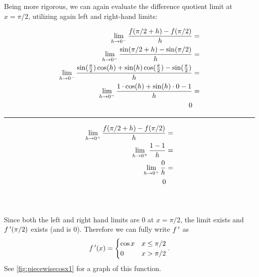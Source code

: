 \begin{example}
Being more rigorous, we can again evaluate the difference quotient limit at $x=\pi/2$, utilizing again left and right-hand limits:\\
{\small{}
\noindent\begin{minipage}{.59\linewidth}
\begin{align*}
\lim_{h\to0^-}\frac{f(\pi/2+h)-f(\pi/2)}{h} =\\
\lim_{h\to0^-}\frac{\sin(\pi/2+h)-\sin(\pi/2)}{h}=\\
\lim_{h\to0^-}{ \frac{\sin(\frac{\pi}{2})\cos(h)+\sin(h)\cos(\frac{\pi}{2})-\sin(\frac{\pi}{2})}{h}}=\\
\lim_{h\to0^-}\frac{1\cdot\cos(h)+\sin(h)\cdot 0-1}{h} =\\
0\hphantom{{}=}
\end{align*}
\end{minipage}%
\begin{minipage}{1pt}
 \rule{.5pt}{100pt}%
\end{minipage}%
\begin{minipage}{.39\linewidth}
\begin{align*}
\lim_{h\to0^+}\frac{f(\pi/2+h)-f(\pi/2)}{h} =\\
\lim_{h\to0^+}\frac{1-1}{h}=\\
\lim_{h\to0^+}\frac{0}{h}=\\
0\hphantom{{}=}\\
\phantom{0}\\
\phantom{0}
\end{align*}
\end{minipage}
}


Since both the left and right hand limits are 0 at $x=\pi/2$, the limit exists and $f\,'(\pi/2)$ exists (and is 0). Therefore we can fully write $f\,'$ as
\[f\,'(x) = \begin{cases}\cos x & x\leq\pi/2\\ 0 & x>\pi/2\end{cases}.\]
See \autoref{fig:piecewisecosx1} for a graph of this function.
\end{example}

